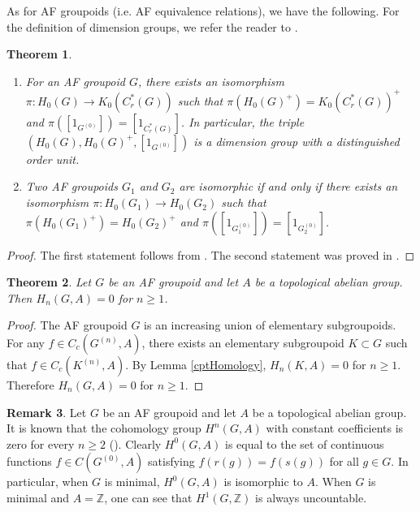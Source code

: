 \documentclass[11pt]{article}
\newtheorem{thm}{Theorem}[section]
\theoremstyle{definition}
\newtheorem{rem}[thm]{Remark}
\newcommand{\Z}{\mathbb{Z}}
\begin{document}
As for AF groupoids (i.e. AF equivalence relations), 
we have the following. 
For the definition of dimension groups, 
we refer the reader to \cite[Section 1.4]{Ro}. 

\begin{thm}\label{AFHomology1}
\begin{enumerate}
\item For an AF groupoid $G$, 
there exists an isomorphism $\pi:H_0(G)\to K_0(C^*_r(G))$ such that 
$\pi(H_0(G)^+)=K_0(C^*_r(G))^+$ and $\pi([1_{G^{(0)}}])=[1_{C^*_r(G)}]$. 
In particular, the triple $(H_0(G),H_0(G)^+,[1_{G^{(0)}}])$ is 
a dimension group with a distinguished order unit. 
\item Two AF groupoids $G_1$ and $G_2$ are isomorphic if and only if 
there exists an isomorphism $\pi:H_0(G_1)\to H_0(G_2)$ such that 
$\pi(H_0(G_1)^+)=H_0(G_2)^+$ and $\pi([1_{G_1^{(0)}}])=[1_{G_2^{(0)}}]$. 
\end{enumerate}
\end{thm}
\begin{proof}
The first statement follows from \cite{R1,HPS,GPS1,GPS3}. 
The second statement was proved in \cite{Kr}. 
\end{proof}

\begin{thm}\label{AFHomology2}
Let $G$ be an AF groupoid and 
let $A$ be a topological abelian group. 
Then $H_n(G,A)=0$ for $n\geq1$. 
\end{thm}
\begin{proof}
The AF groupoid $G$ is an increasing union of elementary subgroupoids. 
For any $f\in C_c(G^{(n)},A)$, 
there exists an elementary subgroupoid $K\subset G$ such that 
$f\in C_c(K^{(n)},A)$. 
By Lemma \ref{cptHomology}, $H_n(K,A)=0$ for $n\geq1$. 
Therefore $H_n(G,A)=0$ for $n\geq1$. 
\end{proof}

\begin{rem}
Let $G$ be an AF groupoid and 
let $A$ be a topological abelian group. 
It is known that 
the cohomology group $H^n(G,A)$ with constant coefficients is zero 
for every $n\geq2$ (\cite[III.1.3]{R1}). 
Clearly $H^0(G,A)$ is equal to 
the set of continuous functions $f\in C(G^{(0)},A)$ satisfying 
$f(r(g))=f(s(g))$ for all $g\in G$. 
In particular, when $G$ is minimal, $H^0(G,A)$ is isomorphic to $A$. 
When $G$ is minimal and $A=\Z$, 
one can see that $H^1(G,\Z)$ is always uncountable. 
\end{rem}
\end{document}
